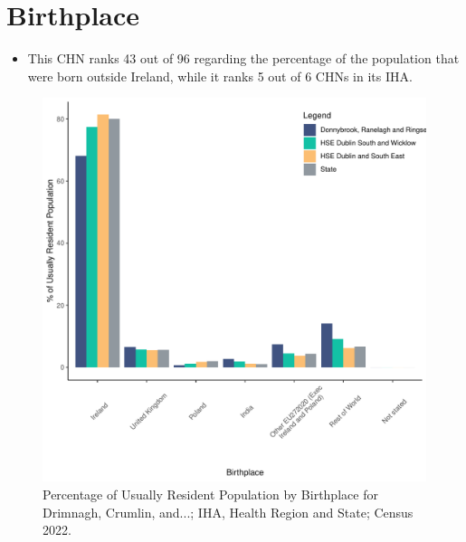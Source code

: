 \documentclass{article}
\begin{document}
\section{Birthplace}\label{sect:Birth}
\begin{itemize}
\item This CHN ranks  43 out of 96 regarding the percentage of the population that were born outside Ireland, while it ranks  5 out of 6 CHNs in its IHA.
\end{itemize}
\begin{figure}[H]
	\centering
	\includegraphics[width = 130mm]{../figures/BirthED.pdf}
	\caption{Percentage of Usually Resident Population by Birthplace for Drimnagh, Crumlin, and...; IHA, Health Region and State; Census 2022.}
	\label{fig:vbnv}
	\end{figure}
	
\end{document}
